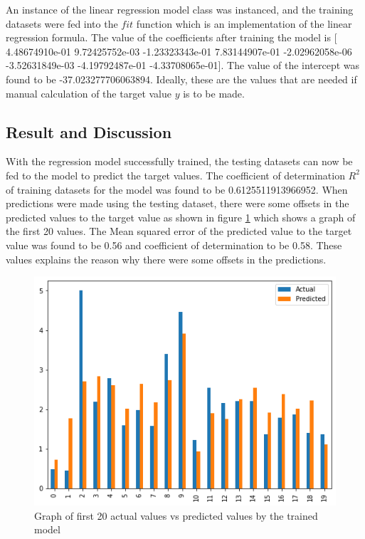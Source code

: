 \documentclass[conference]{IEEEtran}
\begin{document}
An instance of the linear regression model class was instanced, and the training datasets were fed into the $fit$ function which is an implementation of the linear regression formula. The value of the coefficients after training the model is [ 4.48674910e-01  9.72425752e-03 -1.23323343e-01  7.83144907e-01
 -2.02962058e-06 -3.52631849e-03 -4.19792487e-01 -4.33708065e-01]. The value of the intercept was found to be -37.023277706063894. Ideally, these are the values that are needed if manual calculation of the target value $y$ is to be made. 

\subsection{Result and Discussion}
With the regression model successfully trained, the testing datasets can now be fed to the model to predict the target values. The coefficient of determination $R^2$ of training datasets for the model was found to be 0.6125511913966952.
When predictions were made using the testing dataset, there were some offsets in the predicted values to the target value as shown in figure \ref{fig:actual_vs_predicted}  which shows a graph of the first 20 values. The Mean squared error of the predicted value to the target value was found to be 0.56 and coefficient of determination to be 0.58. These values explains the reason why there were some offsets in the predictions.


\begin{figure}[htbp]
	\centerline{\includegraphics [scale=0.5]{figures/actual_vs_predicted.png}}
	\caption{Graph of first 20 actual values vs predicted values by the trained model}
	\label{fig:actual_vs_predicted}
\end{figure}
\end{document}
